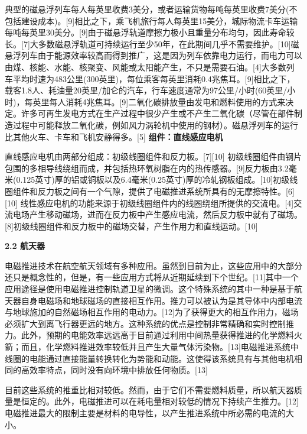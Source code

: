 典型的磁悬浮列车每人每英里收费3美分，或者运输货物每吨每英里收费7美分(不包括建设成本)。[9]相比之下，乘飞机旅行每人每英里15美分，城际物流卡车运输每吨每英里30美分。[9]由于磁悬浮轨道摩擦力极小且重量分布均匀，因此寿命较长。[7]大多数磁悬浮轨道可持续运行至少50年，在此期间几乎不需要维护。[10]磁悬浮列车由于能源效率较高而得到推广，这是因为列车依靠电力运行，而电力可以由煤、核能、水能、核聚变、风能或太阳能产生，不只是需要石油。[4]大多数列车平均时速为483公里(300英里)，每位乘客每英里消耗0.4兆焦耳。[9]相比之下，载客1.8人、耗油量20英里/加仑的汽车，行车速度通常为97公里/小时(60英里/小时)，每英里每人消耗4兆焦耳。[9]二氧化碳排放量由发电和燃料使用的方式来决定。许多可再生发电方式在生产过程中很少产生或不产生二氧化碳（尽管在部件制造过程中可能释放二氧化碳，例如风力涡轮机中使用的钢材）。磁悬浮列车的运行比其他火车、卡车和飞机安静得多。[5]\textbf{ 组件：直线感应电机} 

直线感应电机由两部分组成：初级线圈组件和反力板。[7][10] 初级线圈组件由钢片包围的多相导线绕组而成，并包括热环氧树脂在内的热传感器。[9]反力板由3.2毫米(0.125英寸)厚的铝或铜板以及6.4毫米(0.25英寸)厚的冷轧钢板组成。[10]初级线圈组件和反力板之间有一个气隙，提供了电磁推进系统所具有的无摩擦特性。[6][10] 线性感应电机的功能来源于初级线圈组件内的线圈绕组所提供的交流电。[4]交流电场产生移动磁场，进而在反力板中产生感应电流，然后反力板中就有了磁场。[8]初级线圈组件和反力板中的磁场交替，产生作用力和直线运动。[10]

\textbf{2.2 航天器}

电磁推进技术在航空航天领域有多种应用。虽然到目前为止，这些应用中的大部分还只是概念性的，但是，有一些应用方式将从近期延续到下个世纪。[11]其中一个应用途径是使用电磁推进控制轨道卫星的微调。这个特殊系统的其中一种是基于航天器自身电磁场和地球磁场的直接相互作用。推力可以被认为是其导体中内部电流与地球施加的自然磁场相互作用的电动力。[12]为了获得更大的相互作用力，磁场必须扩大到离飞行器更远的地方。这种系统的优点是控制非常精确和实时控制推力。此外，预期的电能效率远远高于目前通过利用中间热量获得推进的化学燃料火箭；而且，化学燃料推进效率较低并且产生大量气体污染物。[13]电磁推进系统中线圈的电能通过直接能量转换转化为势能和动能。这使得该系统具有与其他电机相同的高效率特点，同时没有向环境中排放任何物质。[13]

目前这些系统的推重比相对较低。然而，由于它们不需要燃料质量，所以航天器质量是恒定的。此外，电磁推进可以在耗电量相对较低的情况下持续产生推力。[12]电磁推进最大的限制主要是材料的电导性，以产生推进系统中所必需的电流的大小。